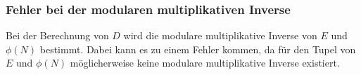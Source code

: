                 \subsubsection{Fehler bei der modularen multiplikativen Inverse}
                    Bei der Berechnung von $D$ wird die modulare multiplikative Inverse von $E$ und $\phi(N)$ bestimmt. Dabei kann es zu einem Fehler kommen, da für den Tupel von $E$ und $\phi(N)$ möglicherweise keine modulare multiplikative Inverse existiert.

                
                




        



      


